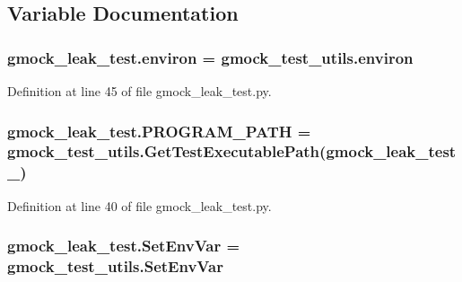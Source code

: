 \subsection{Variable Documentation}
\subsubsection[{\texorpdfstring{environ}{environ}}]{\setlength{\rightskip}{0pt plus 5cm}gmock\+\_\+leak\+\_\+test.\+environ = gmock\+\_\+test\+\_\+utils.\+environ}\hypertarget{namespacegmock__leak__test_a9437a2d2e3bde77354e5c6443ef129f8}{}\label{namespacegmock__leak__test_a9437a2d2e3bde77354e5c6443ef129f8}


Definition at line 45 of file gmock\+\_\+leak\+\_\+test.\+py.

\subsubsection[{\texorpdfstring{P\+R\+O\+G\+R\+A\+M\+\_\+\+P\+A\+TH}{PROGRAM_PATH}}]{\setlength{\rightskip}{0pt plus 5cm}gmock\+\_\+leak\+\_\+test.\+P\+R\+O\+G\+R\+A\+M\+\_\+\+P\+A\+TH = {\bf gmock\+\_\+test\+\_\+utils.\+Get\+Test\+Executable\+Path}(\textquotesingle{}gmock\+\_\+leak\+\_\+test\+\_\+\textquotesingle{})}\hypertarget{namespacegmock__leak__test_ace925116117368cd02a7b45571f5133d}{}\label{namespacegmock__leak__test_ace925116117368cd02a7b45571f5133d}


Definition at line 40 of file gmock\+\_\+leak\+\_\+test.\+py.

\subsubsection[{\texorpdfstring{Set\+Env\+Var}{SetEnvVar}}]{\setlength{\rightskip}{0pt plus 5cm}gmock\+\_\+leak\+\_\+test.\+Set\+Env\+Var = gmock\+\_\+test\+\_\+utils.\+Set\+Env\+Var}\hypertarget{namespacegmock__leak__test_a1ab1da2afb1748500a059d59660330cb}{}\label{namespacegmock__leak__test_a1ab1da2afb1748500a059d59660330cb}


